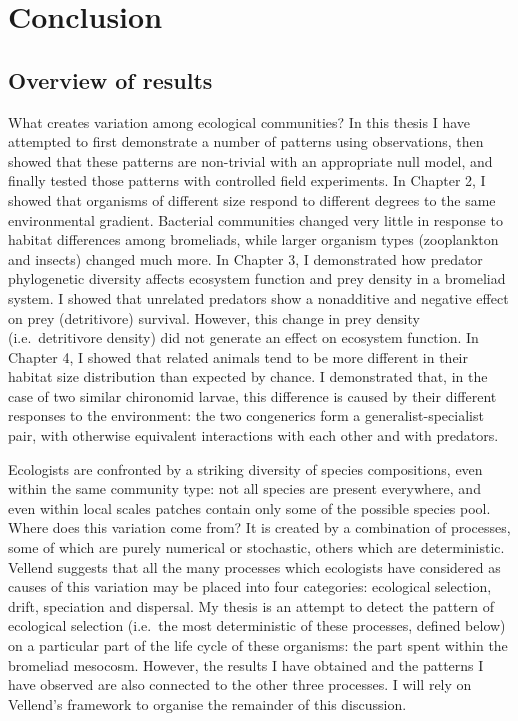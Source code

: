 \chapter{Conclusion}
\label{chap:conclusions}

\section{Overview of results}\label{overview-of-results}

What creates variation among ecological communities? In this thesis I
have attempted to first demonstrate a number of patterns using
observations, then showed that these patterns are non-trivial with an
appropriate null model, and finally tested those patterns with
controlled field experiments. In Chapter 2, I showed that organisms of
different size respond to different degrees to the same environmental
gradient. Bacterial communities changed very little in response to
habitat differences among bromeliads, while larger organism types
(zooplankton and insects) changed much more. In Chapter 3, I
demonstrated how predator phylogenetic diversity affects ecosystem
function and prey density in a bromeliad system. I showed that unrelated
predators show a nonadditive and negative effect on prey (detritivore)
survival. However, this change in prey density (i.e.~detritivore
density) did not generate an effect on ecosystem function. In Chapter 4,
I showed that related animals tend to be more different in their habitat
size distribution than expected by chance. I demonstrated that, in the
case of two similar chironomid larvae, this difference is caused by
their different responses to the environment: the two congenerics form a
generalist-specialist pair, with otherwise equivalent interactions with
each other and with predators.

Ecologists are confronted by a striking diversity of species
compositions, even within the same community type: not all species are
present everywhere, and even within local scales patches contain only
some of the possible species pool. Where does this variation come from?
It is created by a combination of processes, some of which are purely
numerical or stochastic, others which are deterministic. Vellend
\citep{Vellend2010b} suggests that all the many processes which
ecologists have considered as causes of this variation may be placed
into four categories: ecological selection, drift, speciation and
dispersal. My thesis is an attempt to detect the pattern of ecological
selection (i.e.~the most deterministic of these processes, defined
below) on a particular part of the life cycle of these organisms: the
part spent within the bromeliad mesocosm. However, the results I have
obtained and the patterns I have observed are also connected to the
other three processes. I will rely on Vellend's framework to organise
the remainder of this discussion.

